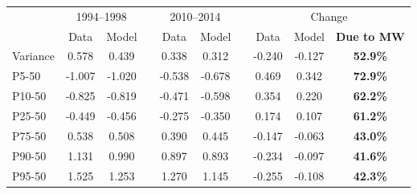 \begin{tabular}{l cc c cc c ccc}
  \hline \hline
  & \multicolumn{2}{c}{1994--1998} && \multicolumn{2}{c}{2010--2014} && \multicolumn{3}{c}{Change} \\ \cline{2-3} \cline{5-6} \cline{8-10}
  & Data & Model && Data & Model && Data & Model & \textbf{Due to MW} \\ \hline
  Variance & 0.578 & 0.439 && 0.338 & 0.312 && -0.240 & -0.127 & \textbf{52.9\%} \\
  P5-50 & -1.007 & -1.020 && -0.538 & -0.678 && 0.469 & 0.342 & \textbf{72.9\%} \\
  P10-50 & -0.825 & -0.819 && -0.471 & -0.598 && 0.354 & 0.220 & \textbf{62.2\%} \\
  P25-50 & -0.449 & -0.456 && -0.275 & -0.350 && 0.174 & 0.107 & \textbf{61.2\%} \\
  P75-50 & 0.538 & 0.508 && 0.390 & 0.445 && -0.147 & -0.063 & \textbf{43.0\%} \\
  P90-50 & 1.131 & 0.990 && 0.897 & 0.893 && -0.234 & -0.097 & \textbf{41.6\%} \\
  P95-50 & 1.525 & 1.253 && 1.270 & 1.145 && -0.255 & -0.108 & \textbf{42.3\%} \\  \hline
\end{tabular}
